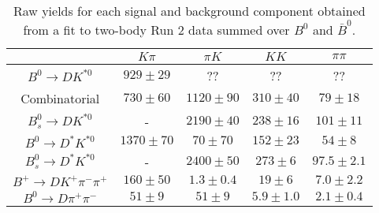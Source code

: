 \begin{table}
  \centering
  \begin{tabular}{ccccc}
      \toprule
       & $K\pi$ & $\pi K$ & $KK$ & $\pi\pi$ \\
      \midrule
      $B^0 \to DK^{*0}$ & $929 \pm 29$ & ?? & ?? & ?? \\
      Combinatorial & $730 \pm 60$ & $1120 \pm 90$ & $310 \pm 40$ & $79 \pm 18$ \\
      $B^0_s \to DK^{*0}$ & \-- & $2190 \pm 40$ & $238 \pm 16$ & $101 \pm 11$ \\
      $B^0 \to D^*K^{*0}$ & $1370 \pm 70$ & $70 \pm 70$ & $152 \pm 23$ & $54 \pm 8$ \\
      $B^0_s \to D^*K^{*0}$ & \-- & $2400 \pm 50$ & $273 \pm 6$ & $97.5 \pm 2.1$ \\
      $B^+ \to DK^+\pi^-\pi^+$ & $160 \pm 50$ & $1.3 \pm 0.4$ & $19 \pm 6$ & $7.0 \pm 2.2$ \\
      $B^0 \to D\pi^+\pi^-$ & $51 \pm 9$ & $51 \pm 9$ & $5.9 \pm 1.0$ & $2.1 \pm 0.4$ \\
      \bottomrule
      \end{tabular}
  \caption{Raw yields for each signal and background component obtained from a fit to two-body Run 2 data summed over $B^0$ and $\bar{B}^0$.}
\label{tab:yields_combined_2body_run2}
\end{table}
